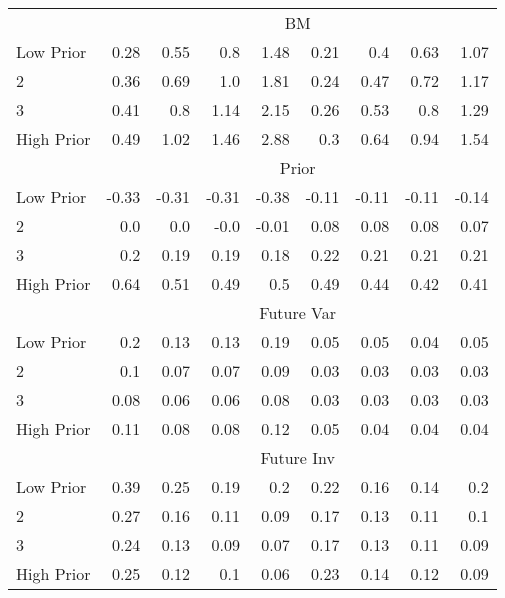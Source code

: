 \begin{table}[!ht]
\begin{tabular}{lrrrrrrrr}
  
    & \multicolumn{8}{c}{BM}  \\
     \cmidrule(r){2-5} \cmidrule(r){6-9}
    Low Prior  & 0.28  & 0.55  & 0.8  & 1.48  & 0.21  & 0.4  & 0.63  & 1.07   \\
    2  & 0.36  & 0.69  & 1.0  & 1.81  & 0.24  & 0.47  & 0.72  & 1.17   \\
    3  & 0.41  & 0.8  & 1.14  & 2.15  & 0.26  & 0.53  & 0.8  & 1.29   \\
    High Prior  & 0.49  & 1.02  & 1.46  & 2.88  & 0.3  & 0.64  & 0.94  & 1.54   \\
    
  
    & \multicolumn{8}{c}{Prior}  \\
     \cmidrule(r){2-5} \cmidrule(r){6-9}
    Low Prior  & -0.33  & -0.31  & -0.31  & -0.38  & -0.11  & -0.11  & -0.11  & -0.14   \\
    2  & 0.0  & 0.0  & -0.0  & -0.01  & 0.08  & 0.08  & 0.08  & 0.07   \\
    3  & 0.2  & 0.19  & 0.19  & 0.18  & 0.22  & 0.21  & 0.21  & 0.21   \\
    High Prior  & 0.64  & 0.51  & 0.49  & 0.5  & 0.49  & 0.44  & 0.42  & 0.41   \\
    
  

    & \multicolumn{8}{c}{Future Var}  \\
     \cmidrule(r){2-5} \cmidrule(r){6-9}
    Low Prior  & 0.2  & 0.13  & 0.13  & 0.19  & 0.05  & 0.05  & 0.04  & 0.05   \\
    2  & 0.1  & 0.07  & 0.07  & 0.09  & 0.03  & 0.03  & 0.03  & 0.03   \\
    3  & 0.08  & 0.06  & 0.06  & 0.08  & 0.03  & 0.03  & 0.03  & 0.03   \\
    High Prior  & 0.11  & 0.08  & 0.08  & 0.12  & 0.05  & 0.04  & 0.04  & 0.04   \\
  
    & \multicolumn{8}{c}{Future Inv}  \\
     \cmidrule(r){2-5} \cmidrule(r){6-9}
    Low Prior  & 0.39  & 0.25  & 0.19  & 0.2  & 0.22  & 0.16  & 0.14  & 0.2   \\
    2  & 0.27  & 0.16  & 0.11  & 0.09  & 0.17  & 0.13  & 0.11  & 0.1   \\
    3  & 0.24  & 0.13  & 0.09  & 0.07  & 0.17  & 0.13  & 0.11  & 0.09   \\
    High Prior  & 0.25  & 0.12  & 0.1  & 0.06  & 0.23  & 0.14  & 0.12  & 0.09   \\
    

\end{tabular}
\end{table}
